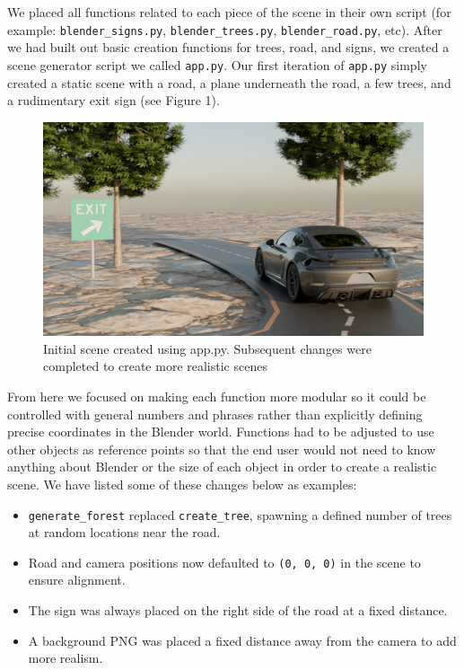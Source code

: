 \documentclass[journal]{IEEEtran}
\begin{document}
 We placed all functions related to each piece of the scene in their own script (for example: \texttt{blender\_signs.py}, \texttt{blender\_trees.py}, \texttt{blender\_road.py}, etc). After we had built out basic creation functions for trees, road, and signs, we created a scene generator script we called \texttt{app.py}. Our first iteration of \texttt{app.py} simply created a static scene with a road, a plane underneath the road, a few trees, and a rudimentary exit sign (see Figure 1).
 
 \begin{figure}[ht]
  \centering
  \includegraphics[width=\linewidth]{images/initial_scene.png}
  \caption{ Initial scene created using app.py. Subsequent changes were completed to create more realistic scenes}
  \label{fig:row_of_images}
\end{figure}
 
 From here we focused on making each function more modular so it could be controlled with general numbers and phrases rather than explicitly defining precise coordinates in the Blender world. Functions had to be adjusted to use other objects as reference points so that the end user would not need to know anything about Blender or the size of each object in order to create a realistic scene. We have listed some of these changes below as examples:
 
 \begin{itemize}
     \item \texttt{generate\_forest} replaced \texttt{create\_tree}, spawning a defined number of trees at random locations near the road.
     \item Road and camera positions now defaulted to \texttt{(0, 0, 0)} in the scene to ensure alignment.
     \item The sign was always placed on the right side of the road at a fixed distance.
     \item A background PNG was placed a fixed distance away from the camera to add more realism.
 \end{itemize}
 
\end{document}
